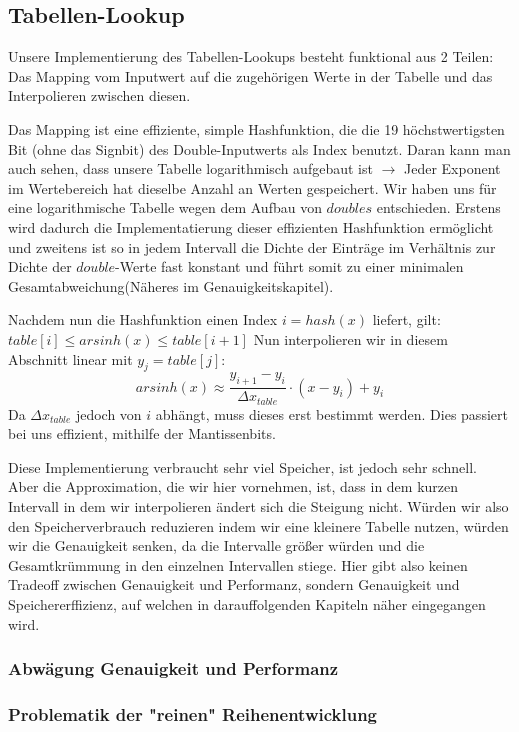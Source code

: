 \documentclass[course=erap] {aspdoc}
\begin{document}
     \subsection{Tabellen-Lookup}
     Unsere Implementierung des Tabellen-Lookups besteht funktional aus 2 Teilen: Das Mapping vom Inputwert auf
     die zugehörigen Werte in der Tabelle und das Interpolieren zwischen diesen.
     
     Das Mapping ist eine effiziente, simple Hashfunktion, die die 19 höchstwertigsten Bit (ohne das Signbit) des Double-Inputwerts als Index benutzt. Daran kann man auch sehen, dass
     unsere Tabelle logarithmisch aufgebaut ist $\rightarrow$ Jeder Exponent im Wertebereich hat dieselbe Anzahl an Werten gespeichert. 
     Wir haben uns für eine logarithmische Tabelle wegen dem Aufbau von $doubles$ entschieden. Erstens wird dadurch die Implementatierung
     dieser effizienten Hashfunktion ermöglicht und zweitens ist so in jedem Intervall die Dichte der Einträge im Verhältnis 
     zur Dichte der $double$-Werte fast konstant und führt somit zu einer minimalen Gesamtabweichung(Näheres im Genauigkeitskapitel).
 
     Nachdem nun die Hashfunktion einen Index $i=hash(x)$ liefert, gilt: $table[i] \leq arsinh(x) \leq table[i+1]$
     Nun interpolieren wir in diesem Abschnitt linear mit $y_j = table[j]$:
     \[
         arsinh(x) \approx \frac{y_{i+1}-y_i}{\Delta x_{table}}\cdot (x-y_i) + y_i
     \]
     Da $\Delta x_{table}$ jedoch von $i$ abhängt, muss dieses erst bestimmt werden. Dies passiert bei uns 
     effizient, mithilfe der Mantissenbits.
     
     Diese Implementierung verbraucht sehr viel Speicher, ist jedoch sehr schnell. Aber die Approximation, die wir hier vornehmen, ist, dass in dem kurzen Intervall in dem wir interpolieren ändert sich die Steigung nicht. Würden wir also den Speicherverbrauch reduzieren indem wir eine kleinere Tabelle nutzen, würden wir die Genauigkeit senken, da die Intervalle größer würden und die Gesamtkrümmung in den einzelnen Intervallen stiege. Hier gibt also keinen Tradeoff zwischen Genauigkeit und Performanz, sondern Genauigkeit und Speichererffizienz, auf welchen in darauffolgenden Kapiteln näher eingegangen wird.
     \subsubsection{Abwägung Genauigkeit und Performanz}
     \subsubsection{Problematik der "reinen" Reihenentwicklung}
     
\end{document}
